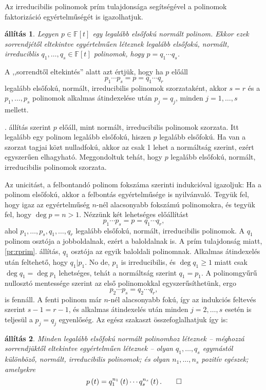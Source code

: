 \documentclass[a4paper, showtrims]{memoir}
\makeatletter
\renewenvironment{proof}[1][\proofname]
    {\par\pushQED{\qed}%
    \normalfont \topsep6\p@\@plus6\p@\relax
    \trivlist
    \item[\hskip\labelsep
        \itshape
    #1\@addpunct{:}]\ignorespaces}
    {\popQED\endtrivlist\@endpefalse}
\theoremstyle{plain}
\newtheorem{proposition}{állítás}[chapter]
\theoremstyle{remark}
\theoremstyle{definition}
\makeatother
\begin{document}
Az irreducibilis polinomok prím tulajdonsága segítségével a polinomok faktorizáció egyértelműségét is igazolhatjuk.
\begin{proposition}
	Legyen $p \in\mathbb{F}\left[ t \right]$ egy legalább elsőfokú normált polinom.
	Ekkor ezek sorrendjétől eltekintve egyértelműen léteznek legalább elsőfokú, normált, irreduciblis $q_1,\ldots,q_s\in\mathbb{F}\left[ t \right]$ polinomok,
	hogy $p=q_1\cdots q_s$.
\end{proposition}
A ,,sorrendtől eltekintés'' alatt azt értjük, hogy ha $p$ előáll
\[
	p_1\cdots p_s=p=q_1\cdots q_r
\]
legalább elsőfokú, normált, irreducibilis polinomok szorzataként,
akkor $s=r$ és a $p_1,\ldots,p_s$ polinomok alkalmas átindexelése után $p_j=q_j$,
minden $j=1,\ldots,s$ mellett.
\begin{proof}
    . állítás
	szerint $p$ előáll, mint normált, irreducibilis polinomok szorzata.
	Itt legalább egy polinom legalább elsőfokú, hiszen $p$ legalább elsőfokú.
	Ha van a szorzat tagjai közt nulladfokú, akkor az csak 1 lehet a normáltság szerint,
	ezért egyszerűen elhagyható.
	Meggondoltuk tehát, hogy $p$ legalább elsőfokú, normált, irreducibilis polinomok szorzata.

	Az unicitást,
	a felbontandó polinom fokszáma szerinti indukcióval igazoljuk:
	Ha a polinom elsőfokú, akkor a felbontás egyértelműsége is nyilvánvaló.
	Tegyük fel, hogy igaz az egyértelműség $n$-nél alacsonyabb fokszámú polinomokra,
	és tegyük fel, hogy $\deg p=n>1$.
	Nézzünk két lehetséges előállítást
	\[
		p_1\cdots p_s=p=q_1\cdots q_r,
	\]
	ahol $p_1,\ldots,p_s,q_1,\ldots,q_r$ legalább elsőfokú, normált, irreducibilis polinomok.
	A $q_1$ polinom osztója a jobboldalnak, ezért a baloldalnak is.
	A prím tulajdonság miatt, \ref{pr:rprim}. állítás, $q_1$ osztója az egyik baloldali polinomnak.
	Alkalmas átindexelés után feltehető, hogy $q_1|p_1$.
	No de, $p_1$ is irreducibilis, és $\deg q_1\geq 1$ miatt csak $\deg q_1=\deg p_1$ lehetséges,
	tehát a normáltság szerint $q_1=p_1$.
	A polinomgyűrű nullosztó mentessége szerint az első polinomokkal egyszerűsíthetünk, ergo
	\[
		p_2\cdots p_s=q_2\cdots q_r,
	\]
	is fennáll.
	A fenti polinom már $n$-nél alacsonyabb fokú,
	így az indukciós feltevés szerint $s-1=r-1$,
	és alkalmas átindexelés után minden $j=2,\ldots,s$ esetén is teljesül a $p_j=q_j$ egyenlőség.
\end{proof}
Az egész szakaszt összefoglalhatjuk így is:
\begin{proposition}
	Minden legalább elsőfokú normált polinomhoz léteznek
	--
	méghozzá sorrendjüktől eltekintve egyértelműen léteznek
	--
	olyan $q_1,\ldots,q_s$ egymástól különböző, normált, irreducibilis polinomok;
	és olyan $n_1,\ldots,n_s$ pozitív egészek;
	amelyekre
	\[
		p\left( t \right)
		=
		q_1^{n_1}\left( t \right)\cdots q_s^{n_s}\left( t \right).\qedhere
	\]
\end{proposition}
\end{document}

